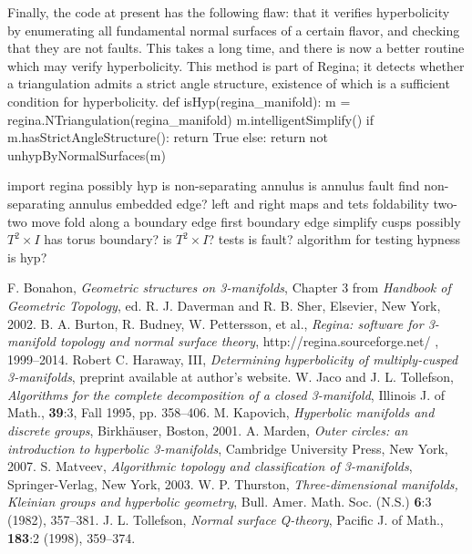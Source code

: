 \documentclass[10pt,twocolumn]{article}%
\theoremstyle{definition}
\begin{document}
\nwendcode{}\nwdocspar
Finally, the code at present has the following
flaw: that it verifies hyperbolicity
by enumerating all fundamental normal
surfaces of a certain flavor, and checking
that they are not faults. This takes
a long time, and there is now a better
routine which may verify hyperbolicity.
This method is part of {\Tt{}Regina\nwendquote}; it
detects whether a triangulation admits
a strict angle structure, existence of which is a
sufficient condition for hyperbolicity.
\nwenddocs{}\endmoddef\nwstartdeflinemarkup\nwenddeflinemarkup
def isHyp(regina_manifold):
  m = regina.NTriangulation(regina_manifold)
  m.intelligentSimplify()
  if m.hasStrictAngleStructure():
    return True
  else:
    return not unhypByNormalSurfaces(m)

\nwendcode{}\endmoddef\nwstartdeflinemarkup\nwenddeflinemarkup
import regina
\LA{}possibly hyp\RA{}
\LA{}is non-separating annulus\RA{}
\LA{}is annulus fault\RA{}
\LA{}find non-separating annulus\RA{}
\LA{}embedded edge?\RA{}
\LA{}left and right maps and tets\RA{}
\LA{}foldability\RA{}
\LA{}two-two move\RA{}
\LA{}fold along a boundary edge\RA{}
\LA{}first boundary edge\RA{}
\LA{}simplify cusps\RA{}
\LA{}possibly $T^2 \times I$\RA{}
\LA{}has torus boundary?\RA{}
\LA{}is $T^2 \times I$?\RA{}
\LA{}tests\RA{}
\LA{}is fault?\RA{}
\LA{}algorithm for testing hypness\RA{}
\LA{}is hyp?\RA{}
\nwendcode{}\nwdocspar
\begin{thebibliography}{9}
  F. Bonahon,
  \emph{Geometric structures on 3-manifolds},
  Chapter 3 from \emph{Handbook of Geometric Topology},
  ed. R. J. Daverman and R. B. Sher, Elsevier, New York, 2002.
  B. A. Burton, R. Budney, W. Pettersson, et al.,
  \emph{{\Tt{}Regina\nwendquote}: software for 3-manifold topology 
  and normal surface theory},
  http://regina.sourceforge.net/ , 1999--2014.
  Robert C. Haraway, III,
  \emph{Determining hyperbolicity of 
   multiply-cusped 3-manifolds},
  preprint available at author's website.
  W. Jaco and J. L. Tollefson,
  \emph{Algorithms for the complete decomposition
   of a closed 3-manifold},
  Illinois J. of Math., \textbf{39}:3, Fall 1995, pp. 358--406.
  M. Kapovich,
  \emph{Hyperbolic manifolds and discrete groups},
  Birkh\"auser, Boston, 2001.
  A. Marden,
  \emph{Outer circles: an introduction to hyperbolic 3-manifolds},
  Cambridge University Press, New York, 2007.
  S. Matveev,
  \emph{Algorithmic topology and classification of 3-manifolds},
  Springer-Verlag, New York, 2003.
  W. P. Thurston,
  \emph{Three-dimensional manifolds, Kleinian groups 
  and hyperbolic geometry},
  Bull. Amer. Math. Soc. (N.S.) \textbf{6}:3 (1982), 357--381.
  J. L. Tollefson,
  \emph{Normal surface Q-theory},
  Pacific J. of Math., \textbf{183}:2 (1998), 359--374.
\end{thebibliography}
\end{document}
